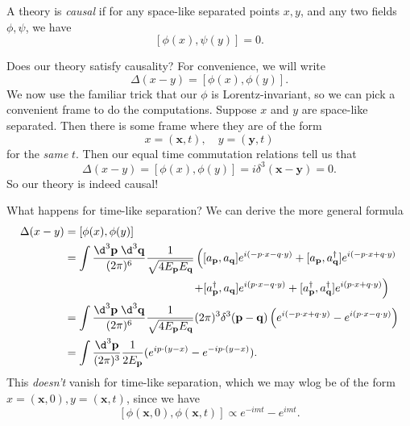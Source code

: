 \documentclass[a4paper]{article}
\begin{document}
\begin{defi}
  A theory is \emph{causal} if for any space-like separated points $x, y$, and any two fields $\phi, \psi$, we have
  \[
    [\phi(x), \psi(y)] = 0.
  \]
\end{defi}
Does our theory satisfy causality? For convenience, we will write
\[
  \Delta(x - y) = [\phi(x), \phi(y)].
\]
We now use the familiar trick that our $\phi$ is Lorentz-invariant, so we can pick a convenient frame to do the computations. Suppose $x$ and $y$ are space-like separated. Then there is some frame where they are of the form
\[
  x = (\mathbf{x}, t),\quad y = (\mathbf{y}, t)
\]
for the \emph{same} $t$. Then our equal time commutation relations tell us that
\[
  \Delta(x - y) = [\phi(x), \phi(y)] = i \delta^3(\mathbf{x} - \mathbf{y}) = 0.
\]
So our theory is indeed causal!

What happens for time-like separation? We can derive the more general formula
\begin{align*}
  \Delta(x - y) &= [\phi(x), \phi(y)]\\
  &= \int \frac{\d^3 \mathbf{p}\;\d^3 \mathbf{q}}{(2\pi)^6}\frac{1}{\sqrt{4E_\mathbf{p} E_\mathbf{q}}} \left([a_\mathbf{p}, a_\mathbf{q}]e^{i(- p\cdot x - q\cdot y)} + [a_\mathbf{p}, a_\mathbf{q}^\dagger] e^{i(-p \cdot x + q\cdot y)}\right.\\
  &\hphantom{= \int \frac{\d^3 \mathbf{p}\;\d^3 \mathbf{q}}{(2\pi)^6}\frac{1}{\sqrt{4E_\mathbf{p} E_\mathbf{q}}}} \left.+[a_\mathbf{p}^\dagger, a_\mathbf{q}]e^{i(p\cdot x - q\cdot y)} + [a_\mathbf{p}^\dagger, a_\mathbf{q}^\dagger] e^{i(p\cdot x + q \cdot y)}\right)\\
  &= \int \frac{\d^3 \mathbf{p}\;\d^3 \mathbf{q}}{(2\pi)^6}\frac{1}{\sqrt{4E_\mathbf{p} E_\mathbf{q}}} (2\pi)^3 \delta^3(\mathbf{p} - \mathbf{q}) \left(e^{i(-p \cdot x + q\cdot y)} - e^{i(p\cdot x - q \cdot y)}\right)\\
  &= \int \frac{\d^3 \mathbf{p}}{(2\pi)^3}\frac{1}{2E_\mathbf{p}} (e^{ip\cdot(y - x)} - e^{-ip\cdot(y - x)}).
\end{align*}
This \emph{doesn't} vanish for time-like separation, which we may wlog be of the form $x = (\mathbf{x}, 0), y = (\mathbf{x}, t)$, since we have
\[
  [\phi(\mathbf{x}, 0), \phi (\mathbf{x}, t)] \propto e^{-imt} - e^{imt}.
\]
%
%
%
\end{document}

